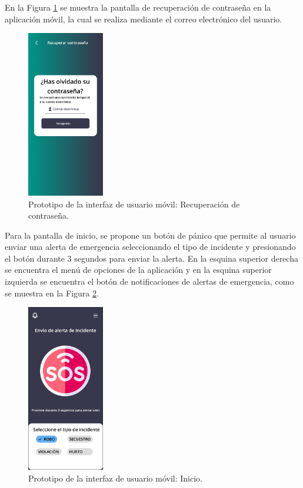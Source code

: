 En la Figura \ref{fig:prototipo-recuperar-contrasena-mobile} se muestra la pantalla de recuperación de contraseña en la aplicación móvil, la cual se realiza
mediante el correo electrónico del usuario.

\begin{figure}[H]
    \centering
    \includegraphics[width=0.3\textwidth]{chapters/III-resultados-y-discusion/resources/images/prototipo-recuperar-contrasena-mobile.png}
    \caption{Prototipo de la interfaz de usuario móvil: Recuperación de contraseña.}
    \label{fig:prototipo-recuperar-contrasena-mobile}
\end{figure}

Para la pantalla de inicio, se propone un botón de pánico que permite al usuario enviar una alerta de emergencia seleccionando el tipo de incidente y
presionando el botón durante 3 segundos para enviar la alerta. En la esquina superior derecha se encuentra el menú de opciones de la aplicación y en la
esquina superior izquierda se encuentra el botón de notificaciones de alertas de emergencia, como se muestra en la Figura \ref{fig:prototipo-inicio-mobile}.

\begin{figure}[H]
    \centering
    \includegraphics[width=0.3\textwidth]{chapters/III-resultados-y-discusion/resources/images/prototipo-inicio-mobile.png}
    \caption{Prototipo de la interfaz de usuario móvil: Inicio.}
    \label{fig:prototipo-inicio-mobile}
\end{figure}

